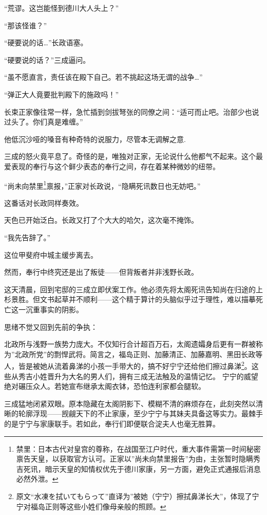 \documentclass[
]{book}
\begin{document}
``荒谬。这岂能怪到德川大人头上？''

``那该怪谁？''

``硬要说的话\ldots{}''长政语塞。

``硬要说的话？''三成逼问。

``虽不愿直言，责任该在殿下自己。若不挑起这场无谓的战争\ldots{}''

``弹正大人竟要批判殿下的施政吗！''

长束正家像往常一样，急忙插到剑拔弩张的同僚之间：``适可而止吧。治部少也说过头了。你们真是难缠。''

他低沉沙哑的嗓音有种奇特的说服力，尽管本无调解之意.

三成的怒火竟平息了。奇怪的是，唯独对正家，无论说什么他都气不起来。这个最爱表现的奉行与这个鲜少表态的奉行之间，存在着某种微妙的纽带。

``尚未向禁里\footnote{禁里：日本古代对皇宫的尊称，在战国至江户时代，重大事件需第一时间秘密禀告天皇，以获取官方认可。正家以''尚未向禁里报告''为由，主张暂时隐瞒秀吉死讯，暗示天皇的知情权优先于德川家康，另一方面，避免正式通报后消息必然外泄。}禀报，''正家对长政说，``隐瞒死讯数日也无妨吧。''

这番话对长政同样奏效。

天色已开始泛白。长政又打了个大大的哈欠，这次毫不掩饰。

``我先告辞了。''

这位甲斐府中城主缓步离去。

然而，奉行中终究还是出了叛徒------但背叛者并非浅野长政。

这天清晨，回到宅邸的三成立即伏案工作。他必须先将太阁死讯告知尚在归途的上杉景胜。但文书起草并不顺利------这个精于算计的头脑似乎过于理性，难以描摹死亡这一沉重事实的阴影。

思绪不觉又回到先前的争执：

北政所与浅野一族势力庞大。不仅知行合计超百万石，太阁遗孀身后更有一群被称为''北政所党''的剽悍武将。简言之，福岛正则、加藤清正、加藤嘉明、黑田长政等人，皆是被她从流着鼻涕的小孩一手带大的，搞不好宁宁还给他们擦过鼻涕\footnote{原文``水凍を拭いてもらって''直译为''被她（宁宁）擦拭鼻涕长大''，体现了宁宁对福岛正则等这些小姓们像母亲般的照顾。}。这些从秀吉小姓晋升为大名的男人们，拥有三成无法触及的温情记忆。 宁宁的威望绝对碾压众人。若她宣布继承太阁衣钵，恐怕连利家都会腿软。

三成猛地闭紧双眼。原本隐藏在太阁阴影下、模糊不清的麻烦存在，此刻突然以清晰的轮廓浮现------觊觎天下的不止家康，至少宁宁与其妹夫具备这等实力。最棘手的是宁宁与家康联手。若如此，奉行们即便联合淀夫人也毫无胜算。
\end{document}
